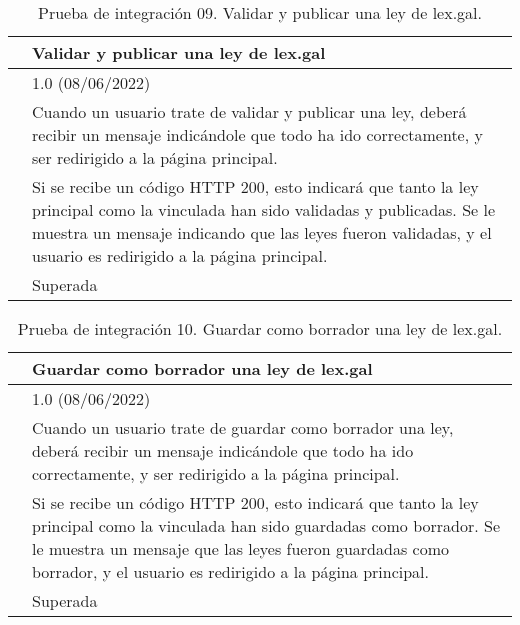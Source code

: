 \begin{table}[H]
\begin{center}
\begin{tabular}{|p{3cm}|p{10cm}|} \hline
\centering {\bf PI-09} & Validar y publicar una ley de lex.gal  \\ \hline\hline
\centering {\bf Versión} & 1.0 (08/06/2022) \\ \hline
\centering {\bf Descripción} & Cuando un usuario trate de validar y publicar una ley, deberá recibir un mensaje indicándole que todo ha ido correctamente, y ser redirigido a la página principal. \\ \hline
\centering {\bf Criterio de aceptación} & Si se recibe un código HTTP 200, esto indicará que tanto la ley principal como la vinculada han sido validadas y publicadas. Se le muestra un mensaje indicando que las leyes fueron validadas, y el usuario es redirigido a la página principal. \\ \hline
\centering {\bf Estado} & Superada \\ \hline
\end{tabular}
\caption{Prueba de integración 09. Validar y publicar una ley de lex.gal.}
\label{enlacePI09}
\end{center}
\end{table}

\begin{table}[H]
\begin{center}
\begin{tabular}{|p{3cm}|p{10cm}|} \hline
\centering {\bf PI-10} & Guardar como borrador una ley de lex.gal  \\ \hline\hline
\centering {\bf Versión} & 1.0 (08/06/2022) \\ \hline
\centering {\bf Descripción} & Cuando un usuario trate de guardar como borrador una ley, deberá recibir un mensaje indicándole que todo ha ido correctamente, y ser redirigido a la página principal. \\ \hline
\centering {\bf Criterio de aceptación} & Si se recibe un código HTTP 200, esto indicará que tanto la ley principal como la vinculada han sido guardadas como borrador. Se le muestra un mensaje que las leyes fueron guardadas como borrador, y el usuario es redirigido a la página principal. \\ \hline
\centering {\bf Estado} & Superada \\ \hline
\end{tabular}
\caption{Prueba de integración 10. Guardar como borrador una ley de lex.gal.}
\label{enlacePI10}
\end{center}
\end{table}

